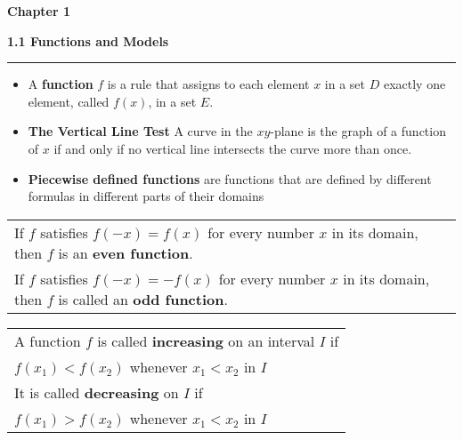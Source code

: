 \documentclass[fleqn]{article}
\begin{document}
\Huge\textbf{Chapter 1}
\vspace{16pt}

\begin{center}
\Large\textbf{1.1 Functions and Models}

\noindent\hfill\rule{0.3\textwidth}{.4pt}\hfill
\vspace{12pt}

\large
\begin{itemize}
	\item A \textbf{function} $f$ is a rule that assigns to each element $x$ in a set $D$ exactly one element, called $f(x)$, in a set $E$.
	\item \textbf{The Vertical Line Test} \: A curve in the $xy$-plane is the graph of a function of $x$ if and only if no vertical line intersects the curve more than once.
	\item \textbf{Piecewise defined functions} are functions that are defined by different formulas in different parts of their domains
\vspace{12pt}
\end{itemize}

\def\arraystretch{1.3}
{\setlength{\tabcolsep}{16pt}
\begin{tabularx}{.9\textwidth}{|X|}
\hline
	\vspace{1pt}
	If $f$ satisfies $f(-x) = f(x)$ for every number $x$ in its domain, then $f$ is an \textbf{even function}.\\[5pt]
	If $f$ satisfies $f(-x)  = -f(x)$ for every number $x$ in its domain, then $f$ is called an \textbf{odd function}.\\[12pt]
\hline
\end{tabularx}}
\vspace{12pt}	
	
\def\arraystretch{1.3}
{\setlength{\tabcolsep}{16pt}
\begin{tabularx}{.9\textwidth}{|X|}
\hline
	\vspace{1pt}
	A function $f$ is called \textbf{increasing} on an interval $I$ if\\ 
	\hspace{12pt} $f(x_1) < f(x_2)$ \hspace{5pt} whenever $x_1 < x_2$ in $I$\\[5pt]
	It is called \textbf{decreasing} on $I$ if\\
	\hspace{12pt}$f(x_1) > f(x_2)$ \hspace{5pt} whenever $x_1 < x_2$ in $I$\\[12pt]
	

\end{tabularx}}
\end{center}
\end{document}
